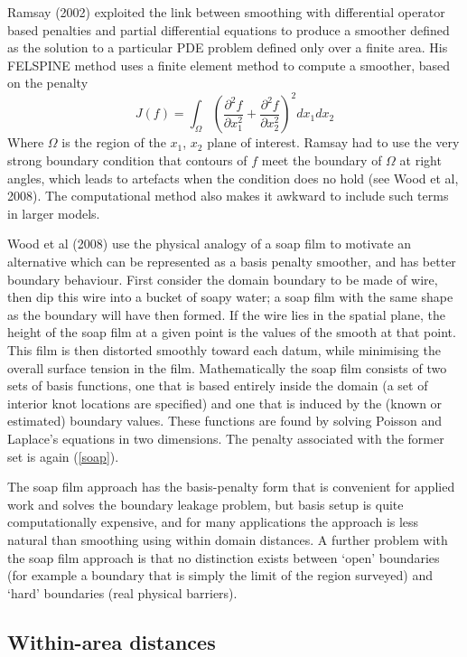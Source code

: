 \documentclass[useAMS, referee]{biom}
\newcommand{\beq}{\begin{equation}}
\newcommand{\eeq}{\end{equation}}
\newcommand{\pdif}[2]{\frac{\partial #1}{\partial #2}}
\begin{document}
Ramsay (2002) exploited the link between smoothing with differential operator based penalties and partial differential equations to produce a smoother defined as the solution to a particular PDE problem defined only over a finite area. His FELSPINE method uses a finite element method to compute a smoother, based on the penalty 
\beq
J(f) = \int_\Omega \left ( \pdif{^2 f}{x_1^2} + \pdif{^2 f}{x_2^2} \right )^2 dx_1 dx_2 
\label{soap}
\eeq 
Where $\Omega$ is the region of the $x_1$, $x_2$ plane of interest. Ramsay had to use the very strong boundary condition that contours of $f$ meet the boundary of $\Omega$ at right angles, which leads to artefacts when the condition does no hold (see Wood et al, 2008). The computational method also makes it awkward to include such terms in larger models.

Wood et al (2008) use the physical analogy of a soap film to motivate an alternative which can be represented as a basis penalty smoother, and has better boundary behaviour. First consider the domain boundary to be made of wire, then dip this wire into a bucket of soapy water; a soap film with the same shape as the boundary will have then formed. If the wire lies in the spatial plane, the height of the soap film at a given point is the values of the smooth at that point. This film is then distorted smoothly toward each datum, while minimising the overall surface tension in the film. Mathematically the soap film consists of two sets of basis functions, one that is based entirely inside the domain (a set of interior knot locations are specified) and one that is induced by the (known or estimated) boundary values. These functions are found by solving Poisson and Laplace's equations in two dimensions. The penalty associated with the former set is again (\ref{soap}). 

The soap film approach has the basis-penalty form that is convenient for applied work and solves the boundary leakage problem, but basis setup is quite computationally expensive, and for many applications the approach is less natural than smoothing using within domain distances. A further problem with the soap film approach is that no distinction exists between `open' boundaries (for example a boundary that is simply the limit of the region surveyed) and `hard' boundaries (real physical barriers).

\subsection*{Within-area distances}
\end{document}

